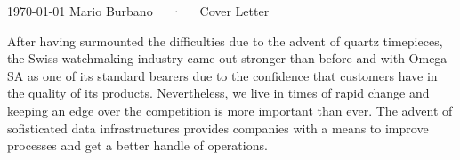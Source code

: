 \documentclass[11pt, a4paper]{awesome-cv}
\begin{document}
\makecvheader[R]

\makecvfooter
  {\today}
  {Mario Burbano~~~·~~~Cover Letter}
  {}

\makelettertitle

\begin{cvletter}

\begin{comment}
Description du poste
Analyser les données horlogères et mettre les résultats sous forme visuelle
Participer activement à l’amélioration et à l’innovation des produits
Rechercher et développer des outils de caractérisation et d’aide à l’analyse des données de contrôle
Participer à la mise en place des structures de données de contrôle des montres et des mouvements
Créer les standards de données horlogères du département
Construire des plans d’expérience pour vérifier certaines données
Gérer des projets d’amélioration de la remonté des données
Profil
Formation de Technicien avec expérience dans l’analyse des données ou formation universitaire dans le domaine de l’ingénierie ou de l’informatique (Ingénieur EPFL)
Expérience en gestion de projets
Maîtrise des logiciels self BI comme Power Bi
Connaissances des outils ETL
Expérience confirmée en SQL et en programmation
Passionné par les données et les techniques innovantes d’analyse (Big data, IA, etc.)
Langue maternelle française et bonne maîtrise de la langue anglaise
Personne dynamique, autonome, rigoureuse, ouverte d'esprit, apte à travailler en équipe et ayant le sens de la communication
Compétences requises
Voir profil ci-dessus

Langues
Langue maternelle française et bonne maîtrise de la langue anglaise
\end{comment}

After having surmounted the difficulties due to the advent of quartz timepieces, the Swiss watchmaking industry came out stronger than before and with Omega SA as one of its standard bearers due to the confidence that customers have in the quality of its products. Nevertheless, we live in times of rapid change and keeping an edge over the competition is more important than ever. The advent of sofisticated data infrastructures provides companies with a means to improve processes and get a better handle of operations.  


\end{cvletter}
\end{document}

